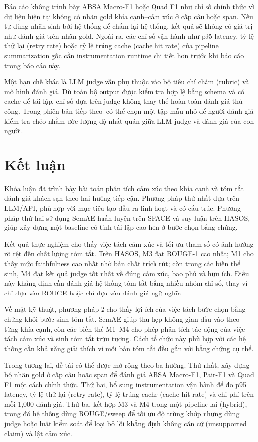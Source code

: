 \documentclass[12pt,a4paper]{report}
\begin{document}
Báo cáo không trình bày ABSA Macro-F1 hoặc Quad F1 như chỉ số chính thức vì dữ liệu hiện tại không có nhãn gold khía cạnh--cảm xúc ở cấp câu hoặc span. Nếu tự dùng nhãn sinh bởi hệ thống để chấm lại hệ thống, kết quả sẽ không có giá trị như đánh giá trên nhãn gold. Ngoài ra, các chỉ số vận hành như p95 latency, tỷ lệ thử lại (retry rate) hoặc tỷ lệ trúng cache (cache hit rate) của pipeline summarization gốc cần instrumentation runtime chi tiết hơn trước khi báo cáo trong báo cáo này.

Một hạn chế khác là LLM judge vẫn phụ thuộc vào bộ tiêu chí chấm (rubric) và mô hình đánh giá. Dù toàn bộ output được kiểm tra hợp lệ bằng schema và có cache để tái lập, chỉ số dựa trên judge không thay thế hoàn toàn đánh giá thủ công. Trong phiên bản tiếp theo, có thể chọn một tập mẫu nhỏ để người đánh giá kiểm tra chéo nhằm ước lượng độ nhất quán giữa LLM judge và đánh giá của con người.

\chapter{Kết luận}

Khóa luận đã trình bày bài toán phân tích cảm xúc theo khía cạnh và tóm tắt đánh giá khách sạn theo hai hướng tiếp cận. Phương pháp thứ nhất dựa trên LLM/API, phù hợp với mục tiêu tạo đầu ra linh hoạt và có cấu trúc. Phương pháp thứ hai sử dụng SemAE huấn luyện trên SPACE và suy luận trên HASOS, giúp xây dựng một baseline có tính tái lập cao hơn ở bước chọn bằng chứng.

Kết quả thực nghiệm cho thấy việc tách cảm xúc và tối ưu tham số có ảnh hưởng rõ rệt đến chất lượng tóm tắt. Trên HASOS, M3 đạt ROUGE-1 cao nhất; M1 cho thấy mức faithfulness cao nhất nhờ bản chất trích rút; còn trong các biến thể sinh, M4 đạt kết quả judge tốt nhất về đúng cảm xúc, bao phủ và hữu ích. Điều này khẳng định cần đánh giá hệ thống tóm tắt bằng nhiều nhóm chỉ số, thay vì chỉ dựa vào ROUGE hoặc chỉ dựa vào đánh giá ngữ nghĩa.

Về mặt kỹ thuật, phương pháp 2 cho thấy lợi ích của việc tách bước chọn bằng chứng khỏi bước sinh tóm tắt. SemAE giúp thu hẹp không gian đầu vào theo từng khía cạnh, còn các biến thể M1--M4 cho phép phân tích tác động của việc tách cảm xúc và sinh tóm tắt trừu tượng. Cách tổ chức này phù hợp với các hệ thống cần khả năng giải thích vì mỗi bản tóm tắt đều gắn với bằng chứng cụ thể.

Trong tương lai, đề tài có thể được mở rộng theo ba hướng. Thứ nhất, xây dựng bộ nhãn gold ở cấp câu hoặc span để đánh giá ABSA Macro-F1, Pair-F1 và Quad F1 một cách chính thức. Thứ hai, bổ sung instrumentation vận hành để đo p95 latency, tỷ lệ thử lại (retry rate), tỷ lệ trúng cache (cache hit rate) và chi phí trên mỗi 1,000 đánh giá. Thứ ba, kết hợp M3 và M4 trong một pipeline lai (hybrid), trong đó hệ thống dùng ROUGE/sweep để tối ưu độ trùng khớp nhưng dùng judge hoặc luật kiểm soát để loại bỏ lỗi khẳng định không căn cứ (unsupported claim) và lật cảm xúc.
\end{document}
